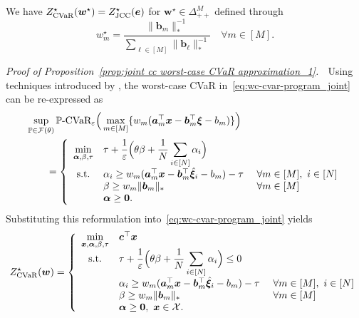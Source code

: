 \documentclass[nonblindrev]{informs2017}
\newcommand{\bmh}[1]{\hat{\bm{#1}}}
\newcommand{\1}[1]{\mathds{1}{\left(#1\right)}}
\begin{document}

\begin{proposition}\label{prop:joint cc worst-case CVaR approximation_1}
We have $Z^\star_{\rm CVaR}(\bm{w}^\star) = Z^\star_{\rm JCC}(\bm e)$ for $\bm{w}^\star\in\Delta_{++}^M$ defined through
\[	
w^\star_m = \frac{\|\bm b_m\|_*^{-1}}{\sum_{\ell\in [M]} \|\bm b_{\ell}\|_*^{-1}} \quad \forall m \in [M].
\]
\end{proposition}

\noindent \emph{Proof of Proposition~\ref{prop:joint cc worst-case CVaR approximation_1}.} $\;$
Using techniques introduced by \cite{Esfahani_Kuhn_2017}, the worst-case CVaR in~\eqref{eq:wc-cvar-program_joint} can be re-expressed as
\begin{align*}
& \sup_{\mathbb{P} \in \mathcal{F}(\theta)} \mathbb{P}\text{-CVaR}_{\varepsilon}\Big(\max_{m \in [M]}\{w_m(\bm{a}^\top_m\bm{x} - \bm{b}^\top_m\bm{\xi} - b_m)\}\Big) \\
& \qquad = \left\{\begin{array}{cll}
\displaystyle{\min_{\bm \alpha, \beta,\tau}} & \displaystyle \tau + \dfrac{1}{\varepsilon} \Big(\theta \beta + \dfrac{1}{N} \sum_{i \in [N]} \alpha_i\Big)  \\
{\rm s.t.} & \alpha_i  \geq w_m(\bm{a}^\top_m\bm{x} - \bm{b}^\top_m\bmh{\xi}_i -b_m) -\tau &~\forall m \in [M], ~i \in [N] \\
& \beta \geq w_m\|\bm{b}_m\|_* &~\forall m \in [M] \\
& \bm{\alpha} \geq \bm{0}.
\end{array}\right.
\end{align*}
Substituting this reformulation into~\eqref{eq:wc-cvar-program_joint} yields
\begin{equation}
\label{eq:cvar-aux0}
Z^\star_{\rm CVaR}(\bm{w}) =\left\{ 
\begin{array}{cll}
\displaystyle \min_{\bm{x},\bm \alpha, \beta,\tau} & \bm{c}^\top\bm{x} \\
{\rm s.t.} & \tau + \dfrac{1}{\varepsilon} \Big(\theta \beta + \dfrac{1}{N} \displaystyle\sum_{i \in [N]} \alpha_i\Big) \leq 0\\
& \alpha_i \geq w_m(\bm{a}^\top_m\bm{x} - \bm{b}^\top_m\bmh{\xi}_i -b_m) -\tau &~\forall m \in [M], ~i \in [N]\\
& \beta \geq w_m\|\bm{b}_m\|_* &~\forall m \in [M] \\
& \bm{\alpha} \geq \bm{0}, ~\bm{x} \in \mathcal{X}.
\end{array}\right.
\end{equation}
\end{document}
